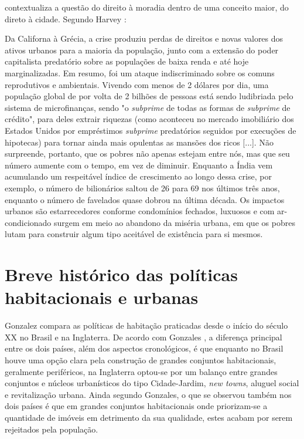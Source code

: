 \documentclass[
	12pt,				%
	oneside,			%
	a4paper,			%
	chapter=TITLE,		%
	section=TITLE,		%
	english,			%
	brazil				%
	]{abntex2}
\begin{document}
\textcite{harvey} contextualiza a questão do direito à moradia dentro de uma conceito
maior, do direto à cidade. Segundo Harvey \autocite*[166]{harvey}:
\begin{citacao}
Da Californa à Grécia, a crise produziu perdas de direitos e novas valores dos
ativos urbanos para a maioria da população, junto com a extensão do poder
capitalista predatório sobre as populações de baixa renda e até hoje
marginalizadas. Em resumo, foi um ataque indiscriminado sobre os comuns
reprodutivos e ambientais. Vivendo com menos de 2 dólares por dia, uma população
global de por volta de 2 bilhões de pessoas está sendo ludibriada pelo sistema
de microfinanças, sendo "o \emph{subprime} de todas as formas de \emph{subprime}
de crédito", para deles extrair riquezas (como aconteceu no mercado imobiliário
dos Estados Unidos por empréstimos \emph{subprime} predatórios seguidos por
execuções de hipotecas) para tornar ainda mais opulentas as mansões dos ricos
[...]. Não surpreende, portanto, que os pobres não apenas estejam entre nós, mas
que seu número aumente com o tempo, em vez de diminuir. Enquanto a Índia vem
acumulando um respeitável índice de crescimento ao longo dessa crise, por
exemplo, o número de bilionários saltou de 26 para 69 nos últimos três anos,
enquanto o número de favelados quase dobrou na última década. Os impactos
urbanos são estarrecedores conforme condomínios fechados, luxuosos e com
ar-condicionado surgem em meio ao abandono da miséria urbana, em que os pobres
lutam para construir algum tipo aceitável de existência para si mesmos.
\end{citacao}
\hypertarget{breve-histuxf3rico-das-poluxedticas-habitacionais-e-urbanas}{%
\section{Breve histórico das políticas habitacionais e urbanas}\label{breve-histuxf3rico-das-poluxedticas-habitacionais-e-urbanas}}

Gonzalez \autocite*{jung2018} compara as políticas de habitação praticadas desde o
início do século XX no Brasil e na Inglaterra. De acordo com Gonzales
\autocite*[165]{jung2018}, a diferença principal entre os dois países, além dos aspectos
cronológicos, é que enquanto no Brasil houve uma opção clara pela construção de
grandes conjuntos habitacionais, geralmente periféricos, na Inglaterra optou-se
por um balanço entre grandes conjuntos e núcleos urbanísticos do tipo
Cidade-Jardim, \emph{new towns}, aluguel social e revitalização urbana. Ainda segundo
Gonzales, o que se observou também nos dois países é que em grandes conjuntos
habitacionais onde priorizam-se a quantidade de imóveis em detrimento da sua
qualidade, estes acabam por serem rejeitados pela população.
\end{document}
